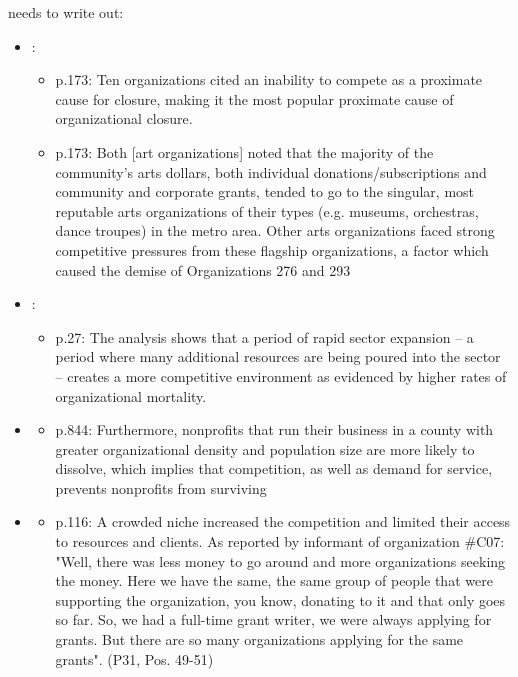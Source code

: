 \documentclass[12pt]{article}
\begin{document}
needs to write out: 
\begin{itemize}
\item \cite{Hager_1999_demise}:
\begin{itemize}
\item p.173: Ten organizations cited an inability to compete as a proximate cause for closure, making it the most popular proximate cause of organizational closure.
\item p.173: Both [art organizations] noted that the majority of the community’s arts dollars, both individual donations/subscriptions and community and corporate grants, tended to go to the singular, most reputable arts organizations of their types (e.g. museums, orchestras, dance troupes) in the metro area. Other arts organizations faced strong competitive pressures from these flagship organizations, a factor which caused the demise of Organizations 276 and 293
\end{itemize}
\item \cite{Lecy_2010_nonprofit}:
\begin{itemize}
\item p.27: The analysis shows that a period of rapid sector expansion – a period where many additional resources are being poured into the sector – creates a more competitive environment as evidenced by higher rates of organizational mortality.
\end{itemize}
\item \cite{Park_Shon_Lu_2021_mortality}
\begin{itemize}
\item p.844: Furthermore, nonprofits that run their business in a county with greater organizational density and population size are more likely to dissolve, which implies that competition, as well as demand for service, prevents nonprofits from surviving
\end{itemize}
\item \cite{HernandezOrtiz_2022_discontinuity}
\begin{itemize}
\item p.116:  A crowded niche increased the competition and limited their access to resources and clients. As reported by informant of organization \#C07: "Well, there was less money to go around and more organizations seeking the money. Here we have the same, the same group of people that were supporting the organization, you know, donating to it and that only goes so far. So, we had a full-time grant writer, we were always applying for grants. But there are so many organizations applying for the same grants". (P31, Pos. 49-51)

\end{itemize}
\end{itemize}
\end{document}
